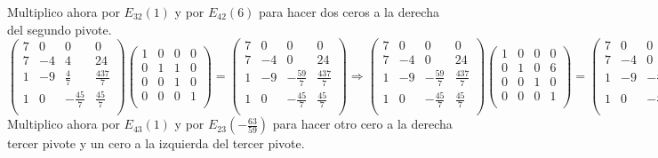 \documentclass[11pt, a4paper]{article}
\newif\IfInSansMode
\theoremstyle{theorem-style}
\theoremstyle{definition-style}
\theoremstyle{remark-style}
\theoremstyle{example-style}
\begin{document}
Multiplico ahora por $E_{32}(1)$ y por $E_{42}(6)$ para hacer dos ceros a la derecha del segundo pivote. \\

$\begin{pmatrix}
7 & 0 & 0 & 0 \\
7 & -4 & 4 & 24 \\
1 & -9 & \frac{4}{7} & \frac{437}{7} \\
1 & 0 & -\frac{45}{7} & \frac{45}{7} \\
\end{pmatrix}
\begin{pmatrix}
1 & 0 & 0 & 0 \\
0 & 1 & 1 & 0 \\
0 & 0 & 1 & 0 \\
0 & 0 & 0 & 1 \\
\end{pmatrix} 
 =
\begin{pmatrix}
7 & 0 & 0 & 0 \\
7 & -4 & 0 & 24 \\
1 & -9 & -\frac{59}{7} & \frac{437}{7} \\
1 & 0 & -\frac{45}{7} & \frac{45}{7} \\
\end{pmatrix} \Longrightarrow
\begin{pmatrix}
7 & 0 & 0 & 0 \\
7 & -4 & 0 & 24 \\
1 & -9 & -\frac{59}{7} & \frac{437}{7} \\
1 & 0 & -\frac{45}{7} & \frac{45}{7} \\
\end{pmatrix}
\begin{pmatrix}
1 & 0 & 0 & 0 \\
0 & 1 & 0 & 6 \\
0 & 0 & 1 & 0 \\
0 & 0 & 0 & 1 \\
\end{pmatrix} 
 = 
\begin{pmatrix}
7 & 0 & 0 & 0 \\
7 & -4 & 0 & 0 \\
1 & -9 & -\frac{59}{7} & \frac{59}{7} \\
1 & 0 & -\frac{45}{7} & \frac{45}{7} \\
\end{pmatrix}$ \\

Multiplico ahora por $E_{43}(1)$ y por $E_{23}(-\frac{63}{59})$ para hacer otro cero a la derecha tercer pivote y un cero a la izquierda del tercer pivote. \\
\end{document}
